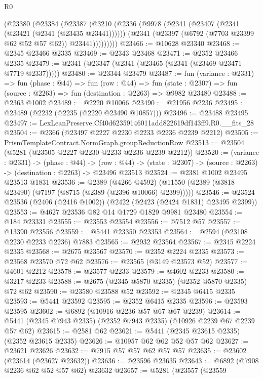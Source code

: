 \begin{lexlean}{R0}
\begin{coremodule}
      (@23380
        (@23384
          (@23387
            (@3210
              (@2336
                (@9978
                  (@2341 (@23407 (@2341 (@23421 (@2341 (@23435 @23441))))))
                  (@2341 (@23397 (@6792 (@7703 @23399 @62 @52 @57 @62)) @23441)))))))))
@23466 := @10628 @23340
@23468 := @2345 @23466 @2335
@23469 := @2343 @23468
@23471 := @2352 @23466 @2335
@23479 := @2341 (@23347 (@2341 (@23465 (@2341 (@23469 @23471 @7719 @2337)))))
@23480 := @23344 @23479
@23487 := fun (variance : @2331) =>
  fun (phase : @44) =>
  fun (row : @44) =>
  fun (state : @2307) => fun (source : @2263) => fun (destination : @2263) => @9982 @23480
@23488 := @2363 @1002
@23489 := @2220 @10066
@23490 := @21956 @2236
@23495 := @23489 (@2232 (@2235 (@2220 @23490 @10857)))
@23496 := @23488 @23495
@23497 := LexLeanPreserve.Cf40d62359146011add822619df143ff9.R0.__fits_28
@23504 := @2366 (@23497 @2227 @2230 @2233 @2236 @2239 @2212)
@23505 := PrismTemplateContract.NormGraph.groupReductionRow
@23513 := @23504 (@5281 (@23505 @2227 @2230 @2233 @2236 @2239 @2212))
@23520 := (variance : @2331) ->
  (phase : @44) ->
  (row : @44) -> (state : @2307) -> (source : @2263) -> (destination : @2263) -> @23496 @23513
@23524 := @2381 @1002 @23495 @23513 @1831
@23536 := @2389
    (@4266 @4592)
    (@11550 (@2389 (@3818 @23490) (@7197 (@8715 (@2389 (@2396 @10066) @2399)))))
@23546 := @23524 @23536 (@2406 (@2416 @1002)) (@2422 (@2423 (@2424 @1831) @23495 @2399))
@23553 := @4627 @23536 @82 @14 @1729 @1829 @9981 @23480
@23554 := @184 @23331
@23555 := @23553 @23554
@23556 := @7512 @57
@23557 := @13390 @23556
@23559 := @5441 @23350 @23353
@23564 := @2594 (@23108 @2230 @2233 @2236) @7883
@23565 := @2932 @23564
@23567 := @2345 @2224 @2335
@23568 := @2675 @23567
@23570 := @2352 @2224 @2335
@23573 := @23568 @23570 @72 @62
@23576 := @23565 (@3149 @23573 @52)
@23577 := @4601 @2212
@23578 := @23577 @2233
@23579 := @4602 @2233
@23580 := @3217 @2233
@23588 := @2675 (@2345 @5870 @2335) (@2352 @5870 @2335) @72 @62
@23590 := @23580 @23588 @52
@23592 := @2345 @6415 @2335
@23593 := @5441 @23592
@23595 := @2352 @6415 @2335
@23596 := @23593 @23595
@23602 := @6892 (@10916 @2236 @57 @67 @67 @2239)
@23614 := @5441 (@2345 @7943 @2335) (@2352 @7943 @2335) (@10926 @2239 @67 @2239 @57 @62)
@23615 := @2581 @62
@23621 := @5441 (@2345 @23615 @2335) (@2352 @23615 @2335)
@23626 := @10957 @62 @62 @52 @57 @62
@23627 := @23621 @23626
@23632 := @7915 @57 @57 @62 @57 @57
@23635 := @23602 (@23614 (@23627 @23632))
@23636 := @23596 @23635
@23643 := @6892 (@7908 @2236 @62 @52 @57 @62) @23632
@23657 := @5281
    (@23557
      (@23559

\end{coremodule}
\end{lexlean}
